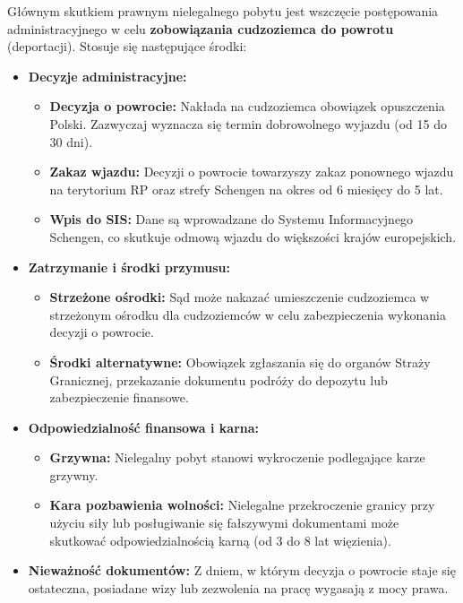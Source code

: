 Głównym skutkiem prawnym nielegalnego pobytu jest wszczęcie postępowania
administracyjnego w celu \textbf{zobowiązania cudzoziemca do powrotu}
(deportacji). Stosuje się następujące środki:

\begin{itemize}
\tightlist
\item
  \textbf{Decyzje administracyjne:}

  \begin{itemize}
  \tightlist
  \item
    \textbf{Decyzja o powrocie:} Nakłada na cudzoziemca obowiązek
    opuszczenia Polski. Zazwyczaj wyznacza się termin dobrowolnego
    wyjazdu (od 15 do 30 dni).
  \item
    \textbf{Zakaz wjazdu:} Decyzji o powrocie towarzyszy zakaz ponownego
    wjazdu na terytorium RP oraz strefy Schengen na okres od 6 miesięcy
    do 5 lat.
  \item
    \textbf{Wpis do SIS:} Dane są wprowadzane do Systemu Informacyjnego
    Schengen, co skutkuje odmową wjazdu do większości krajów
    europejskich.
  \end{itemize}
\item
  \textbf{Zatrzymanie i środki przymusu:}

  \begin{itemize}
  \tightlist
  \item
    \textbf{Strzeżone ośrodki:} Sąd może nakazać umieszczenie
    cudzoziemca w strzeżonym ośrodku dla cudzoziemców w celu
    zabezpieczenia wykonania decyzji o powrocie.
  \item
    \textbf{Środki alternatywne:} Obowiązek zgłaszania się do organów
    Straży Granicznej, przekazanie dokumentu podróży do depozytu lub
    zabezpieczenie finansowe.
  \end{itemize}
\item
  \textbf{Odpowiedzialność finansowa i karna:}

  \begin{itemize}
  \tightlist
  \item
    \textbf{Grzywna:} Nielegalny pobyt stanowi wykroczenie podlegające
    karze grzywny.
  \item
    \textbf{Kara pozbawienia wolności:} Nielegalne przekroczenie granicy
    przy użyciu siły lub posługiwanie się fałszywymi dokumentami może
    skutkować odpowiedzialnością karną (od 3 do 8 lat więzienia).
  \end{itemize}
\item
  \textbf{Nieważność dokumentów:} Z dniem, w którym decyzja o powrocie
  staje się ostateczna, posiadane wizy lub zezwolenia na pracę wygasają
  z mocy prawa.
\end{itemize}

